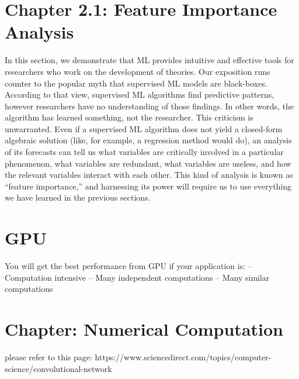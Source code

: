 \documentclass[7pt]{article}
\begin{document}
\section{Chapter 2.1: Feature Importance Analysis}


In this section, we demonstrate that ML provides intuitive and effective tools for researchers who work on the development of theories. Our exposition runs counter to the popular myth that supervised ML models are black-boxes. According to that view, supervised ML algorithms find predictive patterns, however researchers have no understanding of those findings. In other words, the algorithm has learned something, not the researcher. This criticism is unwarranted.
Even if a supervised ML algorithm does not yield a closed-form algebraic solution (like, for example, a regression method would do), an analysis of its forecasts can tell us what variables are critically involved in a particular phenomenon, what variables are redundant, what variables are useless, and how the relevant variables interact with each other. This kind of analysis is known as “feature importance,” and harnessing its power will require us to use everything we have learned in the previous sections.


\section*{GPU}
You will get the best performance from GPU if your application is: – Computation intensive – Many independent computations – Many similar computations

\newpage

\section{Chapter: Numerical Computation}

please refer to this page: https://www.sciencedirect.com/topics/computer-science/convolutional-network
\end{document}
